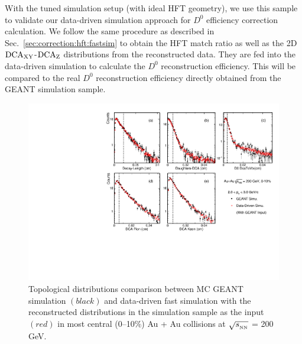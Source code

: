 \documentclass[%
 reprint,	
 amsmath,amssymb,
 aps,
 prc,
]{revtex4-1}
\begin{document}

With the tuned simulation setup (with ideal HFT geometry), we use this sample to validate our data-driven simulation approach for $D^0$ efficiency correction calculation. We follow the same procedure as described in Sec.~\ref{sec:correction:hft:fastsim} to obtain the HFT match ratio as well as the 2D $\textup{DCA}_\textup{XY}$-$\textup{DCA}_\textup{Z}$ distributions from the reconstructed data. They are fed into the data-driven simulation to calculate the $D^0$ reconstruction efficiency. This will be compared to the real $D^0$ reconstruction efficiency directly obtained from the GEANT simulation sample.

\begin{figure}
\centering
\includegraphics[width=1.0\textwidth]{fig/McTopo.pdf}
\caption{Topological distributions comparison between MC GEANT simulation $(black)$ and data-driven fast simulation with the reconstructed distributions in the simulation sample as the input $(red)$ in most central (0--10\%) Au + Au collisions at $\sqrt{s_{_{\rm NN}}}$ = 200\,GeV.}
\label{fig:McTopo} 
\end{figure}
\end{document}
